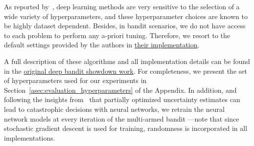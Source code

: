 As reported by~\citet{ip-Riquelme2018}, deep learning methods are very sensitive to the selection of a wide variety of hyperparameters, and these hyperparameter choices are known to be highly dataset dependent. Besides, in bandit scenarios, we do not have access to each problem to perform any a-priori tuning. Therefore, we resort to the default settings provided by the authors in \href{https://github.com/tensorflow/models/tree/master/research/deep_contextual_bandits}{their implementation}.

A full description of these algorithms and all implementation details can be found in the \href{https://sites.google.com/site/deepbayesianbandits/}{original deep bandit showdown work}.
For completeness, we present the set of hyperparameters used for our experiments in Section~\ref{asec:evaluation_hyperparameters} of the Appendix. In addition, and following the insights from~\cite{ip-Riquelme2018} that partially optimized uncertainty estimates can lead to catastrophic decisions with neural networks, we retrain the neural network models at every iteration of the multi-armed bandit ---note that since stochastic gradient descent is used for training, randomness is incorporated in all implementations.

